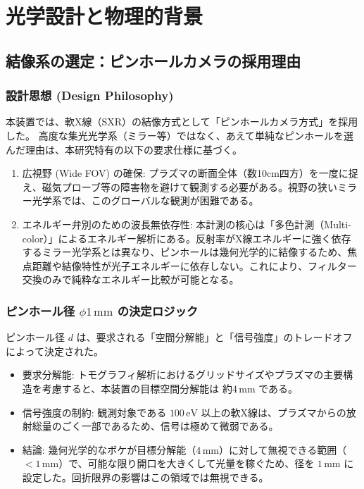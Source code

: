 \section{光学設計と物理的背景}

\subsection{結像系の選定：ピンホールカメラの採用理由}
\subsubsection{設計思想 (Design Philosophy)}
本装置では、軟X線（SXR）の結像方式として「ピンホールカメラ方式」を採用した。
高度な集光光学系（ミラー等）ではなく、あえて単純なピンホールを選んだ理由は、本研究特有の以下の要求仕様に基づく。

\begin{enumerate}
    \item 広視野 (Wide FOV) の確保:
    プラズマの断面全体（数10cm四方）を一度に捉え、磁気プローブ等の障害物を避けて観測する必要がある\cite{Xiang2021}。視野の狭いミラー光学系では、このグローバルな観測が困難である。
    
    \item エネルギー弁別のための波長無依存性:
    本計測の核心は「多色計測（Multi-color）」によるエネルギー解析にある。反射率がX線エネルギーに強く依存するミラー光学系とは異なり、ピンホールは幾何光学的に結像するため、焦点距離や結像特性が光子エネルギーに依存しない。これにより、フィルター交換のみで純粋なエネルギー比較が可能となる。
\end{enumerate}

\subsubsection{ピンホール径 $\phi 1\,\mathrm{mm}$ の決定ロジック}
ピンホール径 $d$ は、要求される「空間分解能」と「信号強度」のトレードオフによって決定された。

\begin{itemize}
    \item 要求分解能: トモグラフィ解析におけるグリッドサイズやプラズマの主要構造を考慮すると、本装置の目標空間分解能は 約$4\,\mathrm{mm}$ である\cite{Xiang2021}。
    \item 信号強度の制約: 観測対象である $100\,\mathrm{eV}$ 以上の軟X線は、プラズマからの放射総量のごく一部であるため、信号は極めて微弱である。
    \item 結論: 幾何光学的なボケが目標分解能（$4\,\mathrm{mm}$）に対して無視できる範囲（$< 1\,\mathrm{mm}$）で、可能な限り開口を大きくして光量を稼ぐため、径を $1\,\mathrm{mm}$ に設定した\cite{Xiang2021}。回折限界の影響はこの領域では無視できる。
\end{itemize}

